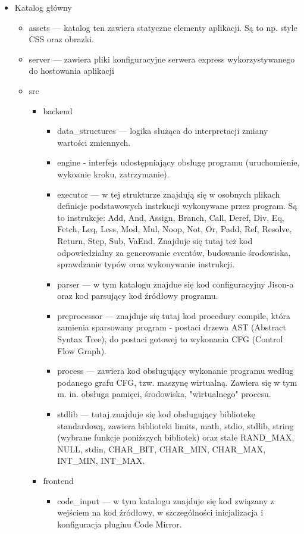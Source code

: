 \documentclass[a4paper,twoside,openright,11pt]{report}
\begin{document}
  \begin {itemize}
    \item Katalog główny
    \begin {itemize}
      \item assets --- katalog ten zawiera statyczne elementy aplikacji. Są to np. style CSS oraz obrazki.
      \item server --- zawiera pliki konfiguracyjne serwera express wykorzystywanego do hostowania aplikacji
      \item src
      \begin {itemize}
        \item backend
	\begin {itemize}
	  \item data\_structures --- logika służąca do interpretacji zmiany wartości zmiennych.
	  \item engine - interfejs udostępniający obsługę programu (uruchomienie, wykoanie kroku, zatrzymanie).
	  \item executor --- w tej strukturze znajdują się w osobnych plikach definicje podstawowych instrkucji wykonywane przez program. Są to instrukcje: Add, And, Assign, Branch, Call, Deref, Div, Eq, Fetch, Leq, Less, Mod, Mul, Noop, Not, Or, Padd, Ref, Resolve, Return, Step, Sub, VaEnd. Znajduje się tutaj też kod odpowiedzialny za generowanie eventów, budowanie środowiska, sprawdzanie typów oraz wykonywanie instrukcji.
	  \item parser --- w tym katalogu znajdue się kod configuracyjny Jison-a oraz kod parsujący kod źródłowy programu.
	  \item preprocessor --- znajduje się tutaj kod procedury compile, która zamienia sparsowany program - postaci drzewa AST (Abstract Syntax Tree), do postaci gotowej to wykonania CFG (Control Flow Graph).
	  \item process --- zawiera kod obsługujący wykonanie programu według podanego grafu CFG, tzw. maszynę wirtualną. Zawiera się w tym m. in. obsługa pamięci, środowiska, "wirtualnego" procesu.
	  \item stdlib --- tutaj znajduje się kod obsługujący bibliotekę standardową, zawiera biblioteki limits, math, stdio, stdlib, string (wybrane funkcje poniższych bibliotek) oraz stałe RAND\_MAX, NULL, stdin, CHAR\_BIT, CHAR\_MIN, CHAR\_MAX, INT\_MIN, INT\_MAX.
	\end {itemize} 
	\item frontend
	\begin {itemize}
	  \item code\_input --- w tym katalogu znajduje się kod związany z wejściem na kod źródłowy, w szczególności inicjalizacja i konfiguracja pluginu Code Mirror.

\end{itemize}
\end{itemize}
\end{itemize}
\end{itemize}
\end{document}
